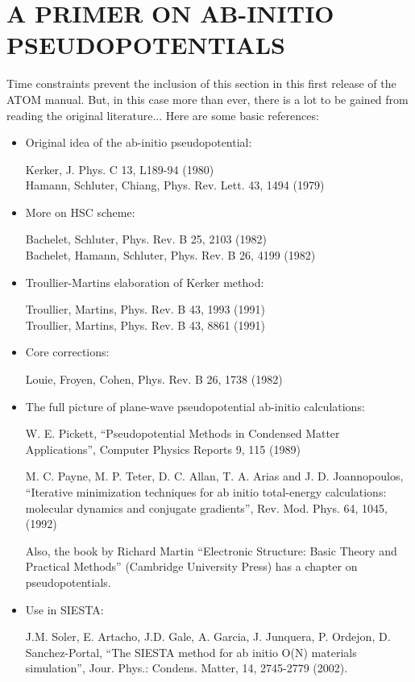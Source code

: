 \documentclass[11pt]{article}
\begin{document}
\section{A PRIMER ON AB-INITIO PSEUDOPOTENTIALS}

Time constraints prevent the inclusion of this section in this first
release of the {\sc ATOM} manual. But, in this case more than ever,
there is a lot to be gained from reading the original literature...
Here are some basic references:

\begin{itemize}
\item Original idea of the ab-initio pseudopotential:

Kerker, J. Phys. C 13, L189-94 (1980)\\
Hamann, Schluter, Chiang, Phys. Rev. Lett. 43, 1494 (1979)

\item More on HSC scheme:

Bachelet, Schluter, Phys. Rev. B 25, 2103 (1982)\\
Bachelet, Hamann, Schluter, Phys. Rev. B 26, 4199 (1982)

\item Troullier-Martins elaboration of Kerker method:

Troullier, Martins, Phys. Rev. B 43, 1993 (1991)\\
Troullier, Martins, Phys. Rev. B 43, 8861 (1991)

\item Core corrections:

Louie, Froyen, Cohen, Phys. Rev. B 26, 1738 (1982)

\item The full picture of plane-wave pseudopotential ab-initio calculations:

W. E. Pickett, ``Pseudopotential Methods in Condensed Matter
Applications'', Computer Physics Reports 9, 115 (1989)

M. C. Payne, M. P. Teter, D. C. Allan, T. A. Arias and
J. D. Joannopoulos, ``Iterative minimization techniques for ab initio
total-energy calculations: molecular dynamics and conjugate
gradients'', Rev. Mod. Phys. 64, 1045, (1992)

Also, the book by Richard Martin
``Electronic Structure: Basic Theory and Practical Methods''
(Cambridge University Press) has a chapter on pseudopotentials.

\item Use in {\sc SIESTA}:

J.M. Soler, E. Artacho, J.D. Gale, A. Garcia, J. Junquera, P. Ordejon,
D. Sanchez-Portal, ``The SIESTA method for ab initio O(N)
materials simulation'', Jour. Phys.: Condens. Matter, 14, 2745-2779
(2002). 

\end{itemize}
\end{document}
